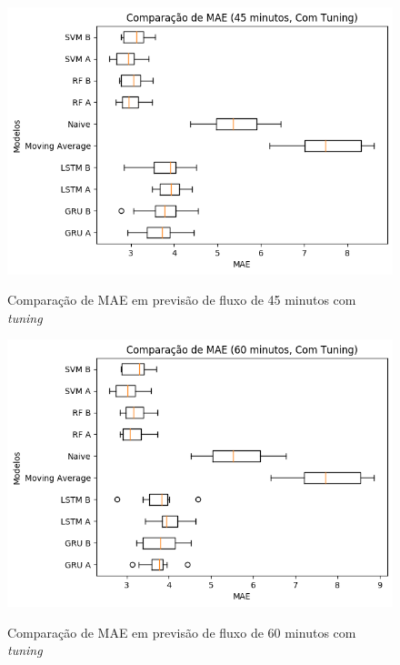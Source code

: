 \begin{figure}[htbp]
    \centering
    \includegraphics[scale=0.8]{monography/img/snapshots/comparacao_de_mae_(45_minutos,_com_tuning)_performance_boxes.png}
    \label{figure:comparacao_previsao_mae_45_com_tuning}
    \caption{Comparação de MAE em previsão de fluxo de 45 minutos com \textit{tuning}}
\end{figure}

\begin{figure}[htbp]
    \centering
    \includegraphics[scale=0.8]{monography/img/snapshots/comparacao_de_mae_(60_minutos,_com_tuning)_performance_boxes.png}
    \label{figure:comparacao_previsao_mae_60_com_tuning}
    \caption{Comparação de MAE em previsão de fluxo de 60 minutos com \textit{tuning}}
\end{figure}

